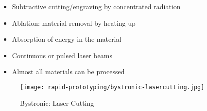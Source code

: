 \begin{frame}
    \begin{itemize}
        \item Subtractive cutting/engraving by concentrated radiation
        \item Ablation: material removal by heating up
        \item Absorption of energy in the material
        \item Continuous or pulsed laser beams
        \item Almost all materials can be processed
    \end{itemize}
    \begin{figure}
        \texttt{[image: rapid-prototyping/bystronic-lasercutting.jpg]}
        \caption{Bystronic: Laser Cutting}
    \end{figure}
\end{frame}